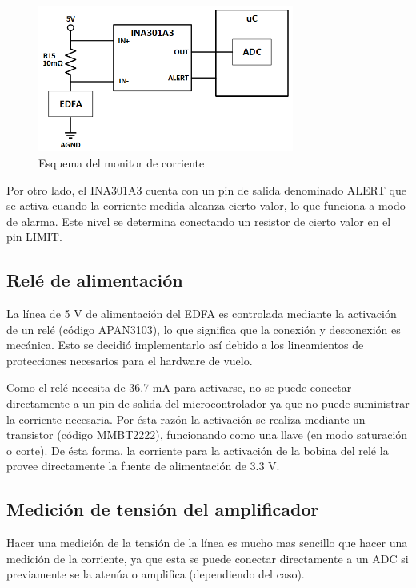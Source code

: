 \begin{figure}[H]
\centering
\includegraphics[width=0.75\textwidth]{./Figures/func_monitor.png}
\caption{Esquema del monitor de corriente}
\label{fig:funcMonitor}
\end{figure}

Por otro lado, el INA301A3 cuenta con un pin de salida denominado ALERT que se activa cuando la corriente medida alcanza cierto valor, lo que funciona a modo de alarma. Este nivel se determina conectando un resistor de cierto valor en el pin LIMIT.

\subsection{Relé de alimentación}

La línea de 5 V de alimentación del EDFA es controlada mediante la activación de un relé (código APAN3103), lo que significa que la conexión y desconexión es mecánica. Esto se decidió implementarlo así debido a los lineamientos de protecciones necesarios para el hardware de vuelo.

Como el relé necesita de 36.7 mA para activarse, no se puede conectar directamente a un pin de salida del microcontrolador ya que no puede suministrar la corriente necesaria. Por ésta razón la activación se realiza mediante un transistor (código MMBT2222), funcionando como una llave (en modo saturación o corte). De ésta forma, la corriente para la activación de la bobina del relé la provee directamente la fuente de alimentación de 3.3 V.

\subsection{Medición de tensión del amplificador}

Hacer una medición de la tensión de la línea es mucho mas sencillo que hacer una medición de la corriente, ya que esta se puede conectar directamente a un ADC si previamente se la atenúa o amplifica (dependiendo del caso).


